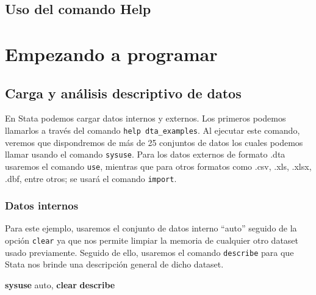 \documentclass[
]{book}
\newenvironment{Shaded}{\begin{snugshade}}{\end{snugshade}}
\newcommand{\KeywordTok}[1]{\textcolor[rgb]{0.13,0.29,0.53}{\textbf{#1}}}
\newcommand{\NormalTok}[1]{#1}
\theoremstyle{definition}
\theoremstyle{definition}
\theoremstyle{definition}
\theoremstyle{definition}
\theoremstyle{remark}
\begin{document}
\hypertarget{uso-del-comando-help}{%
\section{Uso del comando Help}\label{uso-del-comando-help}}

\hypertarget{empezando-a-programar}{%
\chapter{Empezando a programar}\label{empezando-a-programar}}

\hypertarget{carga-y-anuxe1lisis-descriptivo-de-datos}{%
\section{Carga y análisis descriptivo de datos}\label{carga-y-anuxe1lisis-descriptivo-de-datos}}

En Stata podemos cargar datos internos y externos. Los primeros podemos llamarlos a través del comando \texttt{help\ dta\_examples}. Al ejecutar este comando, veremos que dispondremos de más de 25 conjuntos de datos los cuales podemos llamar usando el comando \texttt{sysuse}. Para los datos externos de formato .dta usaremos el comando \texttt{use}, mientras que para otros formatos como .csv, .xls, .xlsx, .dbf, entre otros; se usará el comando \texttt{import}.

\hypertarget{datos-internos}{%
\subsection{Datos internos}\label{datos-internos}}

Para este ejemplo, usaremos el conjunto de datos interno ``auto'' seguido de la opción \texttt{clear} ya que nos permite limpiar la memoria de cualquier otro dataset usado previamente. Seguido de ello, usaremos el comando \texttt{describe} para que Stata nos brinde una descripción general de dicho dataset.

\begin{Shaded}
\begin{Highlighting}[]
\KeywordTok{sysuse}\NormalTok{ auto, }\KeywordTok{clear}
\KeywordTok{describe}
\end{Highlighting}
\end{Shaded}
\end{document}
